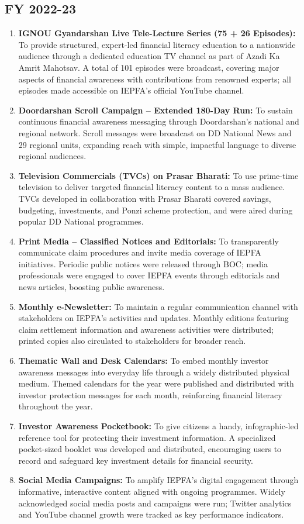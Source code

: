 \documentclass[openany]{book}
\begin{document}
\subsection{FY 2022-23}
\begin{enumerate}
    \item \textbf{IGNOU Gyandarshan Live Tele-Lecture Series (75 + 26 Episodes):} To provide structured, expert-led financial literacy education to a nationwide audience through a dedicated education TV channel as part of Azadi Ka Amrit Mahotsav. A total of 101 episodes were broadcast, covering major aspects of financial awareness with contributions from renowned experts; all episodes made accessible on IEPFA's official YouTube channel.
    \item \textbf{Doordarshan Scroll Campaign – Extended 180-Day Run:} To sustain continuous financial awareness messaging through Doordarshan's national and regional network. Scroll messages were broadcast on DD National News and 29 regional units, expanding reach with simple, impactful language to diverse regional audiences.
    \item \textbf{Television Commercials (TVCs) on Prasar Bharati:} To use prime-time television to deliver targeted financial literacy content to a mass audience. TVCs developed in collaboration with Prasar Bharati covered savings, budgeting, investments, and Ponzi scheme protection, and were aired during popular DD National programmes.
    \item \textbf{Print Media – Classified Notices and Editorials:} To transparently communicate claim procedures and invite media coverage of IEPFA initiatives. Periodic public notices were released through BOC; media professionals were engaged to cover IEPFA events through editorials and news articles, boosting public awareness.
    \item \textbf{Monthly e-Newsletter:} To maintain a regular communication channel with stakeholders on IEPFA's activities and updates. Monthly editions featuring claim settlement information and awareness activities were distributed; printed copies also circulated to stakeholders for broader reach.
    \item \textbf{Thematic Wall and Desk Calendars:} To embed monthly investor awareness messages into everyday life through a widely distributed physical medium. Themed calendars for the year were published and distributed with investor protection messages for each month, reinforcing financial literacy throughout the year.
    \item \textbf{Investor Awareness Pocketbook:} To give citizens a handy, infographic-led reference tool for protecting their investment information. A specialized pocket-sized booklet was developed and distributed, encouraging users to record and safeguard key investment details for financial security.
    \item \textbf{Social Media Campaigns:} To amplify IEPFA's digital engagement through informative, interactive content aligned with ongoing programmes. Widely acknowledged social media posts and campaigns were run; Twitter analytics and YouTube channel growth were tracked as key performance indicators.
\end{enumerate}
\end{document}

